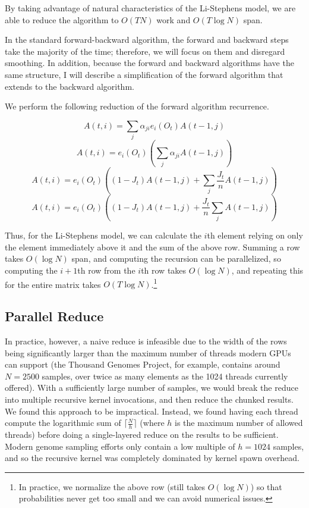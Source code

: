 \documentclass[12pt]{article}
\begin{document}
By taking advantage of natural characteristics of the Li-Stephens model, we are able to reduce the algorithm to $O(TN)$ work and $O(T\log N)$ span.

In the standard forward-backward algorithm, the forward and backward steps take the majority of the time; therefore, we will focus on them and disregard smoothing.  In addition, because the forward and backward algorithms have the same structure, I will describe a simplification of the forward algorithm that extends to the backward algorithm.

We perform the following reduction of the forward algorithm recurrence.

$$ A(t, i) = \sum_j \alpha_{ji} e_i(O_t) A(t-1, j) $$
$$ A(t, i) = e_i(O_t) (\sum_j \alpha_{ji}  A(t-1, j)) $$
$$ A(t, i) = e_i(O_t) ((1-J_t)A(t-1, j) + \sum_j \frac{J_t}{n} A(t-1, j)) $$
$$ A(t, i) = e_i(O_t) ((1-J_t)A(t-1, j) + \frac{J_t}{n}\sum_j A(t-1, j)) $$

Thus, for the Li-Stephens model, we can calculate the $i$th element relying on only the element immediately above it and the sum of the above row.  Summing a row takes $O(\log N)$ span, and computing the recursion can be parallelized, so computing the $i+1$th row from the $i$th row takes $O(\log N)$, and repeating this for the entire matrix takes $O(T\log N)$.\footnote{In practice, we normalize the above row (still takes $O(\log N)$) so that probabilities never get too small and we can avoid numerical issues.}

\subsection{Parallel Reduce}

In practice, however, a naive reduce is infeasible due to the width of the rows
being significantly larger than the maximum number of threads modern GPUs can
support (the Thousand Genomes Project, for example, contains around $N = 2500$
samples, over twice as many elements as the 1024 threads currently offered).
With a sufficiently large number of samples, we would break the reduce into
multiple recursive kernel invocations, and then reduce the chunked results.
We found this approach to be impractical. Instead, we found having each thread
compute the logarithmic sum of $\lceil\frac{N}{h}\rceil$ (where $h$ is the
maximum number of allowed threads) before doing a single-layered reduce on the
results to be sufficient. Modern genome sampling efforts only contain a low
multiple of $h = 1024$ samples, and so the recursive kernel was completely
dominated by kernel spawn overhead.
\end{document}
